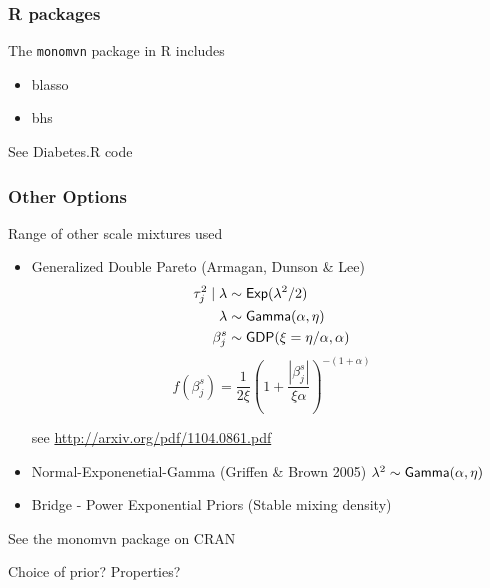 \documentclass[handout]{beamer}
\begin{document}
\begin{frame}
  \frametitle{R packages}
  The {\tt monomvn} package in R includes
  \begin{itemize}
  \item blasso
  \item bhs
  \end{itemize}

See Diabetes.R code



\end{frame}




\begin{frame}
  \frametitle{Other Options}
  Range of other scale mixtures used  \pause
  \begin{itemize}
  \item Generalized Double Pareto (Armagan, Dunson \& Lee)  \pause
\begin{align*}
 \tau_j^2 \mid \lambda & \sim \textsf{Exp}(\lambda^2/2) \\
  \lambda & \sim \textsf{Gamma}(\alpha, \eta) \\
  \beta^s_j & \sim \textsf{GDP}(\xi = \eta/\alpha, \alpha)
\end{align*}
\pause
$$
f(\beta^s_j) = \frac{1}{2 \xi} (1 + \frac{|\beta^s_j|}{\xi \alpha})^{-(1 + \alpha)}
$$

see \url{http://arxiv.org/pdf/1104.0861.pdf} \pause
  \item Normal-Exponenetial-Gamma (Griffen \& Brown 2005)
$\lambda^2 \sim \textsf{Gamma}(\alpha, \eta)$
  \pause
  \item Bridge - Power Exponential Priors  (Stable mixing density) \pause

   \end{itemize}
See the monomvn package on CRAN \pause

\vfill

Choice of prior?   Properties?
\end{frame}
\end{document}
